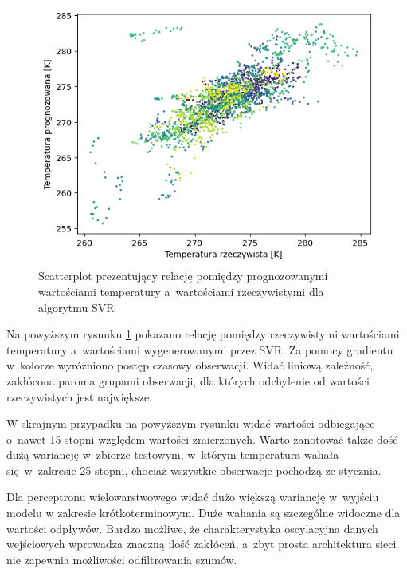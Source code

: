 \begin{figure}[H]
    \centering
    \includegraphics[width=\textwidth]{images/svr_real.png}
    \caption{Scatterplot prezentujący relację pomiędzy prognozowanymi wartościami
    temperatury a~wartościami rzeczywistymi dla algorytmu SVR}
    \label{svr-real}
\end{figure}

Na powyższym rysunku \ref{svr-real} pokazano relację pomiędzy rzeczywistymi wartościami
temperatury a~wartościami wygenerowanymi przez SVR. Za pomocy gradientu w~kolorze wyróżniono postęp
czasowy obserwacji. Widać liniową zależność, zakłócona paroma grupami obserwacji, dla których
odchylenie od wartości rzeczywistych jest największe.

W skrajnym przypadku na powyższym rysunku widać wartości odbiegające o~nawet 15 stopni względem
wartości zmierzonych. Warto zanotować także dość dużą wariancję w~zbiorze testowym, w~którym
temperatura wahała się w~zakresie 25 stopni, chociaż wszystkie obserwacje pochodzą ze stycznia.

\pagebreak

Dla perceptronu wielowarstwowego widać dużo większą wariancję w~wyjściu modelu 
w zakresie krótkoterminowym. Duże wahania są szczególne widoczne dla wartości odpływów.
Bardzo możliwe, że charakterystyka oscylacyjna danych wejściowych wprowadza znaczną
ilość zakłóceń, a~zbyt prosta architektura sieci nie zapewnia możliwości odfiltrowania 
szumów. 


